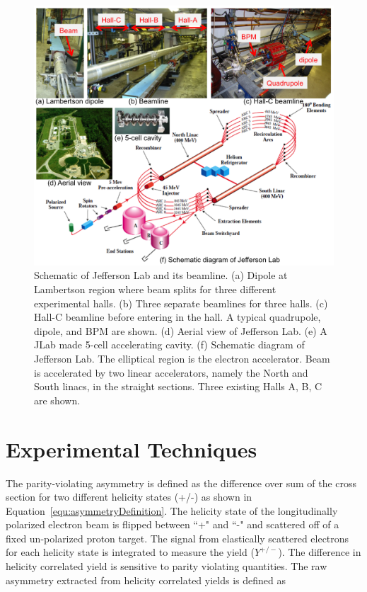 \begin{singlespace}
\begin{figure}[!h]
	\begin{center}
	\includegraphics[width=15.0cm]{figures/jlab}
	\end{center}
	\caption
	{Schematic of Jefferson Lab and its beamline. (a) Dipole at Lambertson region where beam splits for three different experimental halls. (b) Three separate beamlines for three halls. (c) Hall-C beamline before entering in the hall. A typical quadrupole, dipole, and BPM are shown. (d) Aerial view of Jefferson Lab. (e) A JLab made 5-cell accelerating cavity. (f) Schematic diagram of Jefferson Lab. The elliptical region is the electron accelerator. Beam is accelerated by two linear accelerators, namely the North and South linacs, in the straight sections. Three existing Halls A, B, C are shown.}
	\label{fig:jlab}
\end{figure}
\end{singlespace}

\section{Experimental Techniques}%
\label{Experimental Techniques}

The parity-violating asymmetry is defined as the difference over sum of the cross section for two different helicity states (+/-) as shown in Equation~\ref{equ:asymmetryDefinition}. The helicity state of the longitudinally polarized electron beam is flipped between ``+" and ``-" and scattered off of a fixed un-polarized proton target. The signal from elastically scattered electrons for each helicity state is integrated to measure the yield ($Y^{+/-}$). The difference in helicity correlated yield is sensitive to parity violating quantities. The raw asymmetry extracted from helicity correlated yields is defined as

